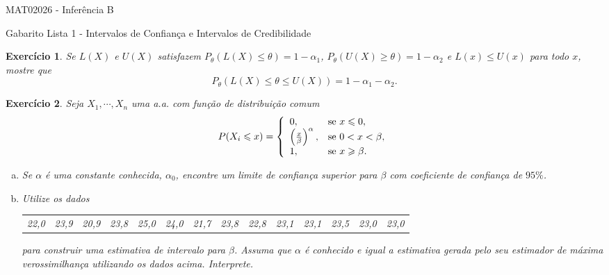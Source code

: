 \documentclass[letter,11pt]{article}
\newtheorem{exer}{Exercício}
\begin{document}
\begin{center}{ \Large MAT02026 - Inferência B }\end{center}

\begin{center}
{\large  \sc Gabarito Lista 1 - Intervalos de Confiança e Intervalos de Credibilidade}
\end{center}
\vspace{5mm}

\begin{exer} \rm
Se $L(X)$ e $U(X)$ satisfazem $P_\theta(L(X)\leqslant\theta)=1-\alpha_1$, 
$P_\theta(U(X)\geqslant\theta)=1-\alpha_2$ e $L(x) \leqslant U(x)$ para todo 
$x$, mostre que
\[P_\theta(L(X)\leqslant\theta\leqslant U(X))=1-\alpha_1-\alpha_2.\]
\end{exer}



\begin{exer} \rm
Seja $X_1,\cdots,X_n$ uma a.a. com função de distribuição comum
\[P(X_i\leqslant x)=\left\{
                          \begin{array}{ll}
                            0, & \hbox{se }x\leqslant0, \\
                            \left(\frac{x}{\beta}\right)^\alpha, & \hbox{se }0<x<\beta, \\
                            1, & \hbox{se }x\geqslant\beta.
                          \end{array}
                        \right.
\]
\begin{enumerate}[a)]
  \item Se $\alpha$ é uma constante conhecida, $\alpha_0$, encontre um limite de confiança superior para $\beta$ com coeficiente de confiança de $95\%$.
  \item Utilize os dados
\begin{tabular}{cccccccccccccc}
 22,0 & 23,9 & 20,9 & 23,8 & 25,0 & 24,0 & 21,7 & 23,8 & 22,8 & 23,1 & 23,1 & 23,5 & 23,0 & 23,0 \\
\end{tabular}
\noindent para construir uma estimativa de intervalo para $\beta$. Assuma que $\alpha$ é conhecido e igual a estimativa gerada pelo seu estimador de máxima verossimilhança utilizando os dados acima. Interprete.
\end{enumerate}
\end{exer}
\end{document}
